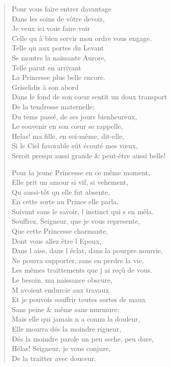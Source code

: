 \begin{verse}
\vin Pour vous faire entrer davantage \\
\vin Dans les soins de vôtre devoir, \\
\vin Je veux ici vous faire voir \\
Celle qu\textquotesingle{} à bien servir mon ordre vous engage. \\
\vin Telle qu\textquotesingle{} aux portes du Levant \\
\vin Se montre la naissante Aurore, \\
\vin Telle parut en arrivant \\
\vin La Princesse plus belle encore. \\
\vin Griselidis à son abord \\
Dans le fond de son cœur sentit un doux transport \\
\vin De la tendresse maternelle; \\
\vin Du tems passé, de ses jours bienheureux, \\
\vin Le souvenir en son cœur se rappelle, \\
\vin Helas! ma fille, en soi-même, dit-elle, \\
Si le Ciel favorable eût écouté mes vœux, \\
Seroit presqu\textquotesingle{} aussi grande \& peut-être aussi belle!

Pour la jeune Princesse en ce même moment, \\
Elle prit un amour si vif, si vehement, \\
\vin Qu\textquotesingle{} aussi-tôt qu\textquotesingle{} elle fut absente, \\
\vin En cette sorte au Prince elle parla, \\
Suivant sans le savoir, l\textquotesingle{} instinct qui s\textquotesingle{} en mêla. \\
\vin Souffrez, Seigneur, que je vous represente, \\
\vin Que cette Princesse charmante, \\
\vin Dont vous allez être l\textquotesingle{} Epoux, \\
Dans l\textquotesingle{} aise, dans l\textquotesingle{} éclat, dans la pourpre nourrie, \\
Ne pourra supporter, sans en perdre la vie, \\
Les mêmes traittements que j\textquotesingle{} ai reçû de vous. \\
\vin Le besoin, ma naissance obscure, \\
\vin M\textquotesingle{} avoient endurcie aux travaux \\
Et je pouvois souffrir toutes sortes de maux \\
\vin Sans peine \& même sans murmure; \\
Mais elle qui jamais n\textquotesingle{} a connu la douleur, \\
\vin Elle mourra dés la moindre rigueur, \\
Dés la moindre parole un peu seche, peu dure, \\
\vin Hélas! Seigneur, je vous conjure, \\
\vin De la traitter avec douceur.


\end{verse}
